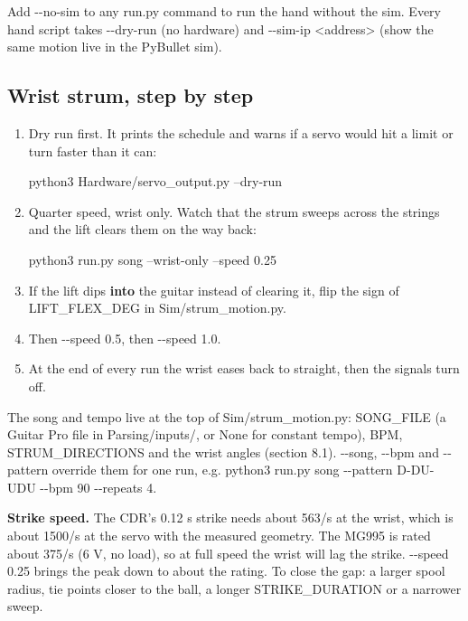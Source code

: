 \documentclass[11pt,letterpaper]{article}
\newcommand{\code}[1]{\textcolor{codeblue}{\ttfamily\smaller\relax #1}}
\begin{document}
Add \code{-{}-{}no-{}\allowbreak{}sim} to any \code{run.py} command to run the hand without the sim. Every hand script takes \code{-{}-{}dry-{}\allowbreak{}run} (no hardware) and \code{-{}-{}sim-{}\allowbreak{}ip <address>} (show the same motion live in the PyBullet sim).


\subsection{Wrist strum, step by step}
\begin{enumerate}
  \item Dry run first. It prints the schedule and warns if a servo would hit a limit or turn faster than it can:
\begin{codeblock}
python3 Hardware/servo_output.py --dry-run
\end{codeblock}
  \item Quarter speed, wrist only. Watch that the strum sweeps across the strings and the lift clears them on the way back:
\begin{codeblock}
python3 run.py song --wrist-only --speed 0.25
\end{codeblock}
  \item If the lift dips \textbf{into} the guitar instead of clearing it, flip the sign of \code{LIFT\_\allowbreak{}FLEX\_\allowbreak{}DEG} in \code{Sim/\allowbreak{}strum\_\allowbreak{}motion.py}.
  \item Then \code{-{}-{}speed 0.5}, then \code{-{}-{}speed 1.0}.
  \item At the end of every run the wrist eases back to straight, then the signals turn off.
\end{enumerate}

The song and tempo live at the top of \code{Sim/\allowbreak{}strum\_\allowbreak{}motion.py}: \code{SONG\_\allowbreak{}FILE} (a Guitar Pro file in \code{Parsing/\allowbreak{}inputs/\allowbreak{}}, or \code{None} for constant tempo), \code{BPM}, \code{STRUM\_\allowbreak{}DIRECTIONS} and the wrist angles (section 8.1). \code{-{}-{}song}, \code{-{}-{}bpm} and \code{-{}-{}pattern} override them for one run, e.g. \code{python3 run.py song -{}-{}pattern D-{}\allowbreak{}DU-{}\allowbreak{}UDU -{}-{}bpm 90 -{}-{}repeats 4}.

\begin{note}\textbf{Strike speed.} The CDR's 0.12 s strike needs about 563\textdegree{}/s at the wrist, which is about 1500\textdegree{}/s at the servo with the measured geometry. The MG995 is rated about 375\textdegree{}/s (6 V, no load), so at full speed the wrist will lag the strike. \code{-{}-{}speed 0.25} brings the peak down to about the rating. To close the gap: a larger spool radius, tie points closer to the ball, a longer \code{STRIKE\_\allowbreak{}DURATION} or a narrower sweep.\end{note}
\end{document}
